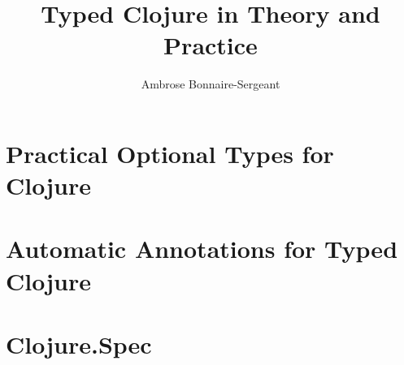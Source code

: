 \documentclass[11pt]{iuthesis}
\newcommand{\thesisauthor}[0]{Ambrose Bonnaire-Sergeant}
\newcommand{\thesistitle}[0]{Typed Clojure in Theory and Practice}
\begin{document}
\frontmatter %
\title{\thesistitle{}}
\author{\thesisauthor{}}



\begin{abstract}

\end{abstract}

\maketitle
\signaturepage
\copyrightpage
\makeabstract

\tableofcontents

\listoffigures

\listoftheorems

\newpage

\mainmatter



\part{Practical Optional Types for Clojure}









\part{Automatic Annotations for Typed Clojure}














\part{Clojure.Spec}
\end{document}
